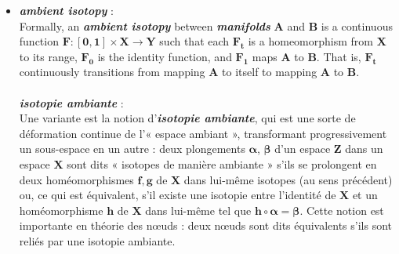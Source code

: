 \documentclass[french]{article}
\begin{document}
\begin{itemize}[label=\textbullet, font=\LARGE \color{blue}]
	\item \textbf{\textit{ambient isotopy}} : \\ Formally, an \textbf{\textit{ambient isotopy}} between \textbf{\textit{manifolds}} $\bm{A}$ and $\bm{B}$ is a continuous function $\bm{F:[0,1]\times X\rightarrow Y}$ such that each $\bm{F_{t}}$ is a homeomorphism from $\bm{X}$ to its range, $\bm{F_{0}}$ is the identity function, and $\bm{F_{1}}$ maps $\bm{A}$ to $\bm{B}$. That is, $\bm{F_{t}}$ continuously transitions from mapping $\bm{A}$ to itself to mapping  $\bm{A}$ to $\bm{B}$.\\ \\
	\textbf{\textit{isotopie ambiante}} :\\ 
	Une variante est la notion d'\textbf{\textit{isotopie ambiante}}, qui est une sorte de déformation continue de l'« espace ambiant », transformant progressivement un sous-espace en un autre : deux plongements $\bm{\alpha}$, $\bm{\beta}$ d'un espace $\bm{Z}$ dans un espace $\bm{X}$ sont dits « isotopes de manière ambiante » s'ils se prolongent en deux homéomorphismes $\bm{f, g}$ de $\bm{X}$ dans lui-même isotopes (au sens précédent) ou, ce qui est équivalent, s'il existe une isotopie entre l'identité de $\bm{X}$ et un homéomorphisme $\bm{h}$ de $\bm{X}$ dans lui-même tel que $\bm{h \circ \alpha=\beta}$. Cette notion est importante en théorie des nœuds : deux nœuds sont dits équivalents s'ils sont reliés par une isotopie ambiante.\\
	
\end{itemize}
\end{document}
